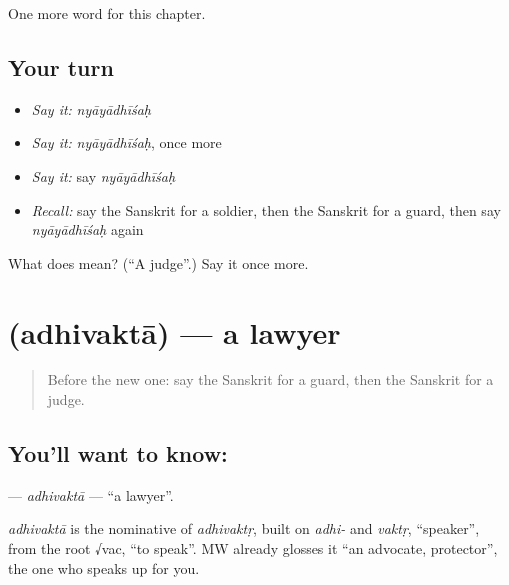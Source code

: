 \begin{grammarlens}[title={What you've built}]
One more word for this chapter.
\end{grammarlens}

\subsection*{Your turn}
\begin{itemize}
\raggedright
  \item \emph{Say it:} \emph{nyāyādhīśaḥ}
  \item \emph{Say it:} \emph{nyāyādhīśaḥ}, once more
  \item \emph{Say it:} say \emph{nyāyādhīśaḥ}
  \item \emph{Recall:} say the Sanskrit for a soldier, then the Sanskrit for a guard, then say \emph{nyāyādhīśaḥ} again
\end{itemize}

\begin{tcolorbox}[breakable,colback=teal!4,colframe=teal!35!black,title={Before you move on}]
What does  mean? (\textquotedblleft{}A judge\textquotedblright{}.) Say it once more.
\end{tcolorbox}
\section[\texorpdfstring{\sk{अधिवक्ता} (adhivaktā)}{अधिवक्ता (adhivaktā)}]{ (adhivaktā) — a lawyer}

\label{lesson:SA-C179-adhivakta}



\begin{quote}
Before the new one: say the Sanskrit for a guard, then the Sanskrit for a judge.
\end{quote}

\subsection*{You'll want to know: }
\textbf{} — \emph{adhivaktā} — \textquotedblleft{}a lawyer\textquotedblright{}.

\begin{cousinweb}
\emph{adhivaktā} is the nominative of \emph{adhivaktṛ}, built on \emph{adhi-} and \emph{vaktṛ}, \textquotedblleft{}speaker\textquotedblright{}, from the root √vac, \textquotedblleft{}to speak\textquotedblright{}. MW already glosses it \textquotedblleft{}an advocate, protector\textquotedblright{}, the one who speaks up for you.
\end{cousinweb}

